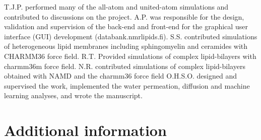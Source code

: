 \documentclass[fleqn,10pt]{wlscirep}
\begin{document}
T.J.P. performed many of the all-atom and united-atom simulations and contributed to discussions on the project.
A.P. was responsible for the design, validation and supervision of the back-end and front-end for the graphical user interface (GUI) development (databank.nmrlipids.fi).
S.S. contributed simulations of heterogeneous lipid membranes including sphingomyelin and ceramides with CHARMM36 force field.
R.T. Provided simulations of complex lipid-bilayers with charmm36m force field.
N.R. contributed simulations of complex lipid-bilayers obtained with NAMD and the charmm36 force field
O.H.S.O. designed and supervised the work, implemented the water permeation, diffusion and machine learning analyses, and wrote the manuscript. 
 






\section*{Additional information}





\end{document}
